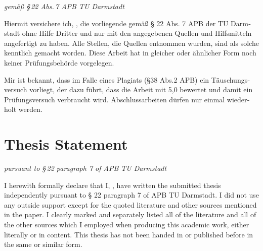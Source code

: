 


\begingroup

\begin{otherlanguage}{ngerman}
\begin{flushright}
	\emph{gemäß §\,22 Abs.\,7 APB TU Darmstadt}
\end{flushright}

Hiermit versichere ich, \myName{}, die vorliegende \myDegree{} gemäß § 22 Abs. 7 APB der TU Darmstadt ohne Hilfe Dritter und nur mit den angegebenen Quellen und Hilfsmitteln angefertigt zu haben. Alle Stellen, die Quellen entnommen wurden, sind als solche kenntlich gemacht worden. Diese Arbeit hat in gleicher oder ähnlicher Form noch keiner Prüfungsbehörde vorgelegen. 

Mir ist bekannt, dass im Falle eines Plagiats (§38 Abs.2 APB) ein Täuschungsversuch vorliegt, der dazu führt, dass die Arbeit mit 5,0 bewertet und damit ein Prüfungsversuch verbraucht wird. Abschlussarbeiten dürfen nur einmal wiederholt werden.

\end{otherlanguage}

\vfill

\let\cleardoublepage\relax
\chapter*{Thesis Statement}
\begin{flushright}
	\emph{pursuant to §\,22 paragraph 7 of APB TU Darmstadt}
\end{flushright}

I herewith formally declare that I, \myName{}, have written the submitted thesis independently pursuant to § 22 paragraph 7 of APB TU Darmstadt. I did not use any outside support except for the quoted literature and other sources mentioned in the paper. I clearly marked and separately listed all of the literature and all of the other sources which I employed when producing this academic work, either literally or in content. This thesis has not been handed in or published before in the same or similar form.


